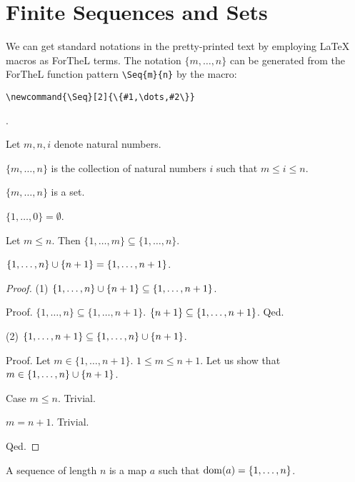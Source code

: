 \documentclass[english,11pt]{article}
\newcommand{\Seq}[2]{\{#1,\dots,#2\}}
\begin{document}
\section{Finite Sequences and Sets}

We can get standard notations in the pretty-printed
text by employing \LaTeX{} macros as ForTheL terms.
The notation $\Seq{m}{n}$ can be generated 
from the ForTheL function pattern
\verb+\Seq{m}{n}+ 
by the 
macro:
\begin{verbatim}
\newcommand{\Seq}[2]{\{#1,\dots,#2\}}
\end{verbatim}.

\begin{forthel}

Let $m,n,i$ denote natural numbers.

\begin{definition}
$\Seq{m}{n}$ is the collection of
natural numbers $i$ such that $m \leq i \leq n$.
\end{definition}

\begin{lemma}
$\Seq{m}{n}$ is a set.
\end{lemma}

\begin{lemma}
$\Seq{1}{0} = \emptyset$.
\end{lemma}

\begin{lemma}
Let $m \leq n$. Then $\Seq{1}{m} \subseteq \Seq{1}{n}$.
\end{lemma}

\begin{lemma}
$\Seq{1}{n} \cup \sing{n+1} = \Seq{1}{n+1}$.
\end{lemma}
\begin{proof}

(1) $\Seq{1}{n} \cup \sing{n+1} \subseteq \Seq{1}{n+1}$.

Proof. $\Seq{1}{n} \subseteq \Seq{1}{n+1}$.
$\sing{n+1} \subseteq \Seq{1}{n+1}$.
Qed.

(2) $\Seq{1}{n+1} \subseteq \Seq{1}{n} \cup \sing{n+1}$.

Proof.
Let $m \in \Seq{1}{n+1}$. $1 \leq m \leq n+1$. Let us show that 
$m \in \Seq{1}{n} \cup \sing{n+1}$.

Case $m \leq n$. Trivial.

$m = n+1$. Trivial.

Qed.

\end{proof}

\begin{definition}
A sequence of length $n$ is a
map $a$ such that $\dom(a) = \Seq{1}{n}$.
\end{definition}


\end{forthel}
\end{document}
